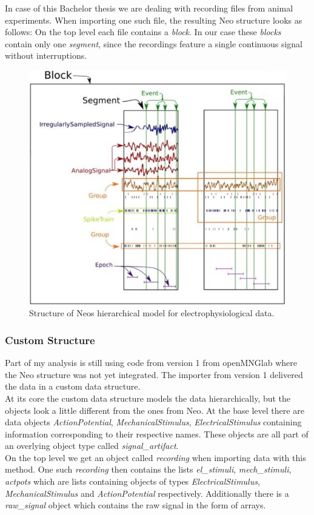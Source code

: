 In case of this Bachelor thesis we are dealing with recording files from animal experiments. When importing one such file, the resulting Neo structure looks as follows: On the top level each file contains a \textit{block}. In our case these \textit{blocks} contain only one \textit{segment}, since the recordings feature a single continuous signal without interruptions.

\begin{figure}
	\includegraphics[width = \textwidth]{src/pic/neo_structure}
	\caption{Structure of Neos hierarchical model for electrophysiological data.}
	\label{fig:neostructure}
\end{figure}

\subsubsection{Custom Structure}
Part of my analysis is still using code from version 1 from openMNGlab where the Neo structure was not yet integrated. The importer from version 1 delivered the data in a custom data structure.\\
At its core the custom data structure models the data hierarchically, but the objects look a little different from the ones from Neo. At the base level there are data objects \textit{ActionPotential}, \textit{MechanicalStimulus}, \textit{ElectricalStimulus} containing information corresponding to their respective names. These objects are all part of an overlying object type called \textit{signal\_artifact}.\\
On the top level we get an object called \textit{recording} when importing data with this method. One such \textit{recording} then contains the lists \textit{el\_stimuli}, \textit{mech\_stimuli}, \textit{actpots} which are lists containing objects of types \textit{ElectricalStimulus}, \textit{MechanicalStimulus} and \textit{ActionPotential} respectively. Additionally there is a \textit{raw\_signal} object which contains the raw signal in the form of arrays.

